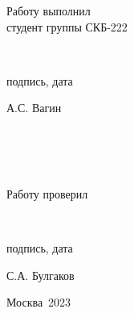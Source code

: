 \documentclass[a4paper, 12pt]{article}
\begin{document}
\begin{titlepage}
\begin{flushright}
\begin{minipage}[center]{15cm}
    \begin{minipage}[left]{5cm}
      {Работу выполнил\\студент группы СКБ-222}
    \end{minipage}
    \begin{minipage}[center]{5cm}
      \vspace{1.25cm}
      \hrulefill\\[-1cm]
      \begin{center}{подпись, дата}\end{center}
    \end{minipage}
    \begin{minipage}[right]{4cm}
      \vspace{0.4cm}
      \begin{flushright}{А.С. Вагин}\end{flushright}
    \end{minipage}
    \\
    \\
    \\
    \begin{minipage}[left]{5cm}
      {Работу проверил}
    \end{minipage}
    \begin{minipage}[center]{5cm}
      \vspace{1.25cm}
      \hrulefill\\[-1cm]
      \begin{center}{подпись, дата}\end{center}
    \end{minipage}
    \begin{minipage}[right]{4cm}
      \begin{flushright}{С.А. Булгаков}\end{flushright}
    \end{minipage}
  \end{minipage}
\end{flushright}

\vspace{\fill}

\begin{center}
Москва~2023
\end{center}
\end{titlepage}
\setcounter{page}{2}
\setcounter{secnumdepth}{5}
\setcounter{tocdepth}{5}

\tableofcontents
\cleardoublepage

\setcounter{section}{1}
\graphicspath{ {./images/} }
\end{document}
